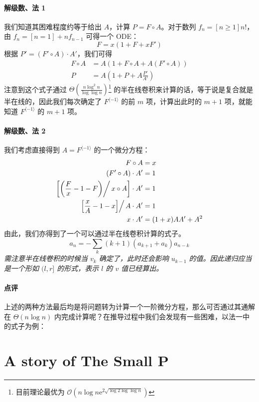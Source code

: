 \documentclass[12pt]{ctexart}
\theoremstyle{theorem}
\theoremstyle{theorem}
\begin{document}
\paragraph{解级数、法 1} 我们知道其困难程度约等于给出 $A$，计算 $P = F\circ A$。对于数列 $f_n = [n\ge 1]n!$，由 $f_n = [n=1] + nf_{n-1}$ 可得一个 ODE：
$$
F = x(1 + F + xF')
$$
根据 $P' = (F'\circ A)\cdot A'$，我们可得
\begin{align*}
F\circ A &= A(1 + F\circ A + A(F'\circ A))\\
P &= A \left(1+ P + A \frac{P'}{A'}\right)
\end{align*}
注意到这个式子通过 $\Theta \left(\frac{n\log^2 n}{\log\log n}\right)$\footnote{目前理论最优为 $\mathcal O\left(n\log n\mathrm{e}^{2\sqrt{\log 2\log\log n}}\right)$} 的半在线卷积来计算的话，等于说是复合就是半在线的，因此我们每次确定了 $F^{\langle -1 \rangle}$ 的前 $m$ 项，计算出此时的 $m+1$ 项，就能知道 $F^{\langle -1 \rangle}$ 的 $m+1$ 项。

\paragraph{解级数、法 2} 我们考虑直接得到 $A = F^{\langle -1 \rangle}$ 的一个微分方程：
\begin{align*}
F\circ A &= x\\
(F'\circ A)\cdot A' &= 1\\
\left[\left(\frac Fx - 1-F\middle ) \right/ x\circ A\right]\cdot A' &= 1\\
\left[ \frac xA - 1 - x \middle]\right/ A \cdot A' &= 1\\
x\cdot A' &= (1+x)AA'+A^2
\end{align*}
由此，我们亦得到了一个可以通过半在线卷积计算的式子。
$$
a_n = -\sum_k (k+1)(a_{k+1}+a_k) a_{n-k}
$$
\emph{需注意半在线卷积的时候当 $v_k$ 确定了，此时还会影响 $u_{k-1}$ 的值。因此递归应当是一个形如 $(l, r]$ 的形式，表示 $l$ 的 $v$ 值已经算出。}

\paragraph{点评}

上述的两种方法最后均是将问题转为计算一个一阶微分方程，那么可否通过其通解在 $\Theta(n\log n)$ 内完成计算呢？在推导过程中我们会发现有一些困难，以法一中的式子为例：

\newpage

\section{A story of The Small P}
\end{document}
